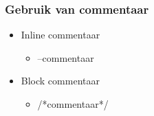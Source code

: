 \documentclass[a4paper,12pt]{article}
\begin{document}
\subsubsection{Gebruik van commentaar}
\begin{itemize}
\item Inline commentaar
	\begin{itemize}
	\item --commentaar
	\end{itemize}
\item Block commentaar
	\begin{itemize}
	\item /*commentaar*/
	\end{itemize}
\end{itemize}
\end{document}
